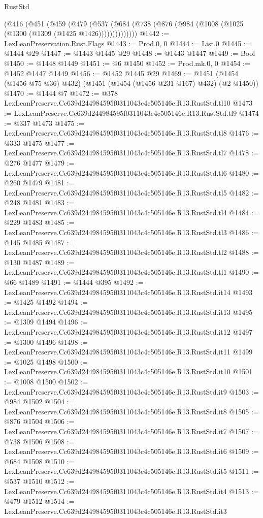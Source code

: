 \begin{lexlean}{RustStd}
\begin{coremodule}
    (@416
      (@451
        (@459
          (@479 (@537 (@684 (@738 (@876 (@984 (@1008 (@1025 (@1300 (@1309 (@1425 @1426))))))))))))))
@1442 := LexLeanPreservation.Rust.Flags
@1443 := Prod.{0, 0}
@1444 := List.{0}
@1445 := @1444 @29
@1447 := @1443 @1445 @29
@1448 := @1443 @1447
@1449 := Bool
@1450 := @1448 @1449
@1451 := @6 @1450
@1452 := Prod.mk.{0, 0}
@1454 := @1452 @1447 @1449
@1456 := @1452 @1445 @29
@1469 := @1451 (@1454 (@1456 @75 @36) @432) (@1451 (@1454 (@1456 @231 @167) @432) (@2 @1450))
@1470 := @1444 @7
@1472 := @378 LexLeanPreserve.Cc639d244984595f0311043c4c505146e.R13.RustStd.tl10
@1473 := LexLeanPreserve.Cc639d244984595f0311043c4c505146e.R13.RustStd.tl9
@1474 := @337 @1473
@1475 := LexLeanPreserve.Cc639d244984595f0311043c4c505146e.R13.RustStd.tl8
@1476 := @333 @1475
@1477 := LexLeanPreserve.Cc639d244984595f0311043c4c505146e.R13.RustStd.tl7
@1478 := @276 @1477
@1479 := LexLeanPreserve.Cc639d244984595f0311043c4c505146e.R13.RustStd.tl6
@1480 := @260 @1479
@1481 := LexLeanPreserve.Cc639d244984595f0311043c4c505146e.R13.RustStd.tl5
@1482 := @248 @1481
@1483 := LexLeanPreserve.Cc639d244984595f0311043c4c505146e.R13.RustStd.tl4
@1484 := @229 @1483
@1485 := LexLeanPreserve.Cc639d244984595f0311043c4c505146e.R13.RustStd.tl3
@1486 := @145 @1485
@1487 := LexLeanPreserve.Cc639d244984595f0311043c4c505146e.R13.RustStd.tl2
@1488 := @130 @1487
@1489 := LexLeanPreserve.Cc639d244984595f0311043c4c505146e.R13.RustStd.tl1
@1490 := @66 @1489
@1491 := @1444 @395
@1492 := LexLeanPreserve.Cc639d244984595f0311043c4c505146e.R13.RustStd.it14
@1493 := @1425 @1492
@1494 := LexLeanPreserve.Cc639d244984595f0311043c4c505146e.R13.RustStd.it13
@1495 := @1309 @1494
@1496 := LexLeanPreserve.Cc639d244984595f0311043c4c505146e.R13.RustStd.it12
@1497 := @1300 @1496
@1498 := LexLeanPreserve.Cc639d244984595f0311043c4c505146e.R13.RustStd.it11
@1499 := @1025 @1498
@1500 := LexLeanPreserve.Cc639d244984595f0311043c4c505146e.R13.RustStd.it10
@1501 := @1008 @1500
@1502 := LexLeanPreserve.Cc639d244984595f0311043c4c505146e.R13.RustStd.it9
@1503 := @984 @1502
@1504 := LexLeanPreserve.Cc639d244984595f0311043c4c505146e.R13.RustStd.it8
@1505 := @876 @1504
@1506 := LexLeanPreserve.Cc639d244984595f0311043c4c505146e.R13.RustStd.it7
@1507 := @738 @1506
@1508 := LexLeanPreserve.Cc639d244984595f0311043c4c505146e.R13.RustStd.it6
@1509 := @684 @1508
@1510 := LexLeanPreserve.Cc639d244984595f0311043c4c505146e.R13.RustStd.it5
@1511 := @537 @1510
@1512 := LexLeanPreserve.Cc639d244984595f0311043c4c505146e.R13.RustStd.it4
@1513 := @479 @1512
@1514 := LexLeanPreserve.Cc639d244984595f0311043c4c505146e.R13.RustStd.it3

\end{coremodule}
\end{lexlean}
